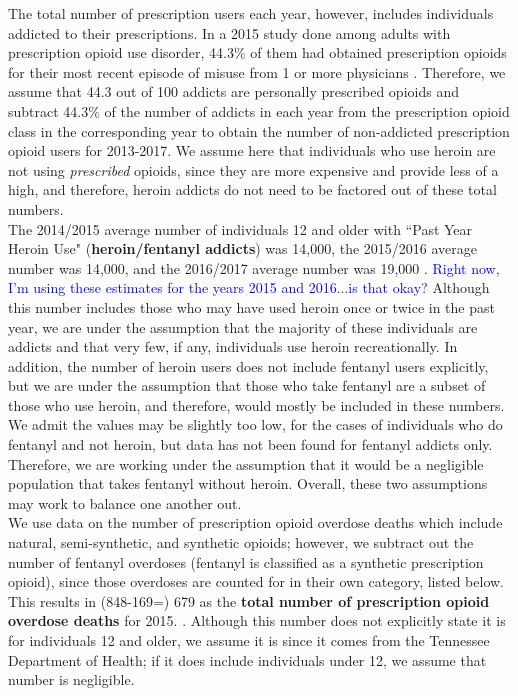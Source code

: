 \documentclass[12pt]{article}
\begin{document}
The total number of prescription users each year, however, includes individuals addicted to their prescriptions. In a 2015 study done among adults with prescription opioid use disorder, 44.3\% of them had obtained prescription opioids for their most recent episode of misuse from 1 or more physicians \cite{Han}. Therefore, we assume that 44.3 out of 100 addicts are personally prescribed opioids and subtract 44.3\% of the number of addicts in each year from the prescription opioid class in the corresponding year to obtain the number of non-addicted prescription opioid users for 2013-2017. We assume here that individuals who use heroin are not using \textit{prescribed} opioids, since they are more expensive and provide less of a high, and therefore, heroin addicts do not need to be factored out of these total numbers. \\
The 2014/2015 average number of individuals 12 and older with ``Past Year Heroin Use" (\textbf{heroin/fentanyl addicts}) was 14,000, the 2015/2016 average number was 14,000, and the 2016/2017 average number was 19,000 \cite{NSDUH0, NSDUH2, NSDUH3}. \textcolor{blue}{Right now, I'm using these estimates for the years 2015 and 2016...is that okay?}  Although this number includes those who may have used heroin once or twice in the past year, we are under the assumption that the majority of these individuals are addicts and that very few, if any, individuals use heroin recreationally. In addition, the number of heroin users does not include fentanyl users explicitly, but we are under the assumption that those who take fentanyl are a subset of those who use heroin, and therefore, would mostly be included in these numbers. We admit the values may be slightly too low, for the cases of individuals who do fentanyl and not heroin, but data has not been found for fentanyl addicts only. Therefore, we are working under the assumption that it would be a negligible population that takes fentanyl without heroin. Overall, these two assumptions may work to balance one another out. \\

We use data on the number of prescription opioid overdose deaths which include natural, semi-synthetic, and synthetic opioids; however, we subtract out the number of fentanyl overdoses (fentanyl is classified as a synthetic prescription opioid), since those overdoses are counted for in their own category, listed below. This results in (848-169=) 679 as the \textbf{total number of prescription opioid overdose deaths} for 2015. \cite{PDO}. Although this number does not explicitly state it is for individuals 12 and older, we assume it is since it comes from the Tennessee Department of Health; if it does include individuals under 12, we assume that number is negligible. \\
\end{document}
